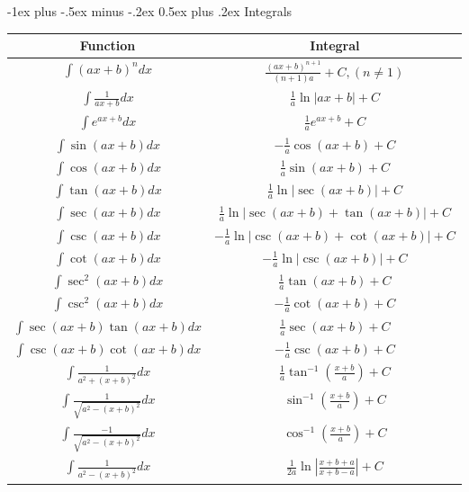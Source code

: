\documentclass[10pt,landscape, a4paper]{article}
\makeatletter
\renewcommand{\section}{\@startsection{section}{1}{0mm}%
                                {-1ex plus -.5ex minus -.2ex}%
                                {0.5ex plus .2ex}%
                                {\normalfont\large\bfseries}}
\makeatother
\begin{document}
\begin{multicols}{3}
\section{Integrals}
\begin{center}
\bgroup
\def\arraystretch{1.5}
    \begin{tabular}{|c | c |}
        \hline
	Function & Integral \\
        \hline
        $\int(ax + b)^n dx$ & $\frac{(ax + b)^{n + 1}}{(n + 1)a} + C, (n \neq 1)$ \\
        \hline
        $\int\frac{1}{ax + b} dx$ & $\frac{1}{a}\ln|ax + b| + C$ \\
        \hline
        $\int e^{ax + b} dx$ & $\frac{1}{a}e^{ax + b} + C$ \\
        \hline
        $\int\sin(ax + b) dx$ & $-\frac{1}{a}\cos(ax + b) + C$ \\
        \hline
        $\int\cos(ax + b) dx$ & $\frac{1}{a}\sin(ax + b) + C$ \\
        \hline
        $\int\tan(ax + b) dx$ & $\frac{1}{a}\ln|\sec(ax + b)| + C$ \\
        \hline
        $\int\sec(ax + b) dx$ & $\frac{1}{a}\ln|\sec(ax + b) + \tan(ax + b)| + C$ \\
        \hline
        $\int\csc(ax + b) dx$ & $-\frac{1}{a}\ln|\csc(ax + b) + \cot(ax + b)| + C$ \\
        \hline
        $\int\cot(ax + b) dx$ & $-\frac{1}{a}\ln|\csc(ax + b)| + C$ \\
        \hline
        $\int\sec^2(ax + b) dx$ & $\frac{1}{a}\tan(ax + b) + C$ \\
        \hline
        $\int\csc^2(ax + b) dx$ & $-\frac{1}{a}\cot(ax + b) + C$ \\
        \hline
        $\int\sec(ax + b)\tan(ax + b) dx$ & $\frac{1}{a}\sec(ax + b) + C$ \\
        \hline
        $\int\csc(ax + b)\cot(ax + b) dx$ & $-\frac{1}{a}\csc(ax + b) + C$ \\
        \hline
        $\int\frac{1}{a^2 + (x + b)^2} dx$ & $\frac{1}{a}\tan^{-1}(\frac{x + b}{a}) + C$ \\
        \hline
        $\int\frac{1}{\sqrt{a^2 - (x + b)^2}} dx$ & $\sin^{-1}(\frac{x + b}{a}) + C$ \\
        \hline
        $\int\frac{-1}{\sqrt{a^2 - (x + b)^2}} dx$ & $\cos^{-1}(\frac{x + b}{a}) + C$ \\
        \hline
        $\int\frac{1}{a^2 - (x + b)^2} dx$ & $\frac{1}{2a}\ln|\frac{x + b + a}{x + b - a}| + C$ \\

\end{tabular}
\end{center}
\end{multicols}
\end{document}
